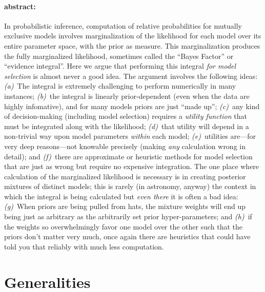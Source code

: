 \documentclass[12pt,twoside]{article}
\begin{document}
\paragraph{abstract:}
In probabilistic inference, computation of relative probabilities for
mutually exclusive models involves marginalization of the likelihood
for each model over its entire parameter space, with the prior as
measure.
This marginalization produces the fully marginalized likelihood,
sometimes called the ``Bayes Factor'' or ``evidence integral''.
Here we argue that performing this integral \emph{for model selection}
is almost never a good idea.
The argument involves the following ideas:
  \textsl{(a)}~The integral is extremely challenging to perform
  numerically in many instances;
  \textsl{(b)}~the integral is linearly prior-dependent (even when the
  data are highly infomative), and for many models priors are just
  ``made up'';
  \textsl{(c)}~any kind of decision-making (including model selection)
  requires a \emph{utility function} that must be integrated along
  with the likelihood;
  \textsl{(d)}~that utility will depend in a non-trivial way upon
  model parameters \emph{within} each model;
  \textsl{(e)}~utilities are---for very deep reasons---not knowable
  precisely (making \emph{any} calculation wrong in detail); and
  \textsl{(f)}~there are approximate or heuristic methods for model
  selection that are just as wrong but require no expensive
  integration.
The one place where calculation of the marginalized likelihood is
necessary is in creating posterior mixtures of distinct models; this
is rarely (in astronomy, anyway) the context in which the integral is
being calculated but \emph{even there} it is often a bad idea:
  \textsl{(g)}~When priors are being pulled from hats, the mixture
  weights will end up being just as arbitrary as the arbitrarily set
  prior hyper-parameters; and
  \textsl{(h)}~if the weights so overwhelmingly favor one model over
  the other such that the priors don't matter very much, once again
  there are heuristics that could have told you that reliably with
  much less computation.

\section{Generalities}
\end{document}

